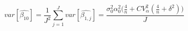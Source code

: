 \begin{equation}
var[\hat{\beta_{10}}] = \frac{1}{J^2}\sum\limits_{j=1}^{J}{var[\hat{\beta_{1,j}}]} = \frac{\sigma_0^2\alpha_0^2\Big(\frac{4}{n} + CV_{\alpha}^2(\frac{4}{n} + \delta^2)\Big)}{J}
\end{equation}